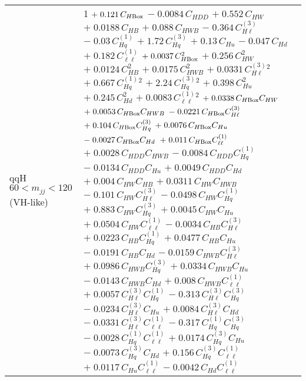 \begin{tabular}{l|p{}}
    qqH $60 < m_{jj} < 120$ (VH-like) & 1 $+\;0.121\,C_{H\rm{Box}}$ $-\;0.0084\,C_{HDD}$ $+\;0.552\,C_{HW}$ $+\;0.0188\,C_{HB}$ $+\;0.088\,C_{HWB}$ $-\;0.364\,C^{(3)}_{H\ell}$ $-\;0.03\,C^{(1)}_{Hq}$ $+\;1.72\,C^{(3)}_{Hq}$ $+\;0.13\,C_{Hu}$ $-\;0.047\,C_{Hd}$ $+\;0.182\,C^{(1)}_{\ell\ell}$ $+\;0.0037\,C_{H\rm{Box}}^{2}$ $+\;0.256\,C_{HW}^{2}$ $+\;0.0124\,C_{HB}^{2}$ $+\;0.0175\,C_{HWB}^{2}$ $+\;0.0331\,C^{(3)}_{H\ell}^{2}$ $+\;0.667\,C^{(1)}_{Hq}^{2}$ $+\;2.24\,C^{(3)}_{Hq}^{2}$ $+\;0.398\,C_{Hu}^{2}$ $+\;0.245\,C_{Hd}^{2}$ $+\;0.0083\,C^{(1)}_{\ell\ell}^{2}$ $+\;0.0338\,C_{H\rm{Box}}C_{HW}$ $+\;0.0053\,C_{H\rm{Box}}C_{HWB}$ $-\;0.0221\,C_{H\rm{Box}}C^{(3)}_{H\ell}$ $+\;0.104\,C_{H\rm{Box}}C^{(3)}_{Hq}$ $+\;0.0076\,C_{H\rm{Box}}C_{Hu}$ $-\;0.0027\,C_{H\rm{Box}}C_{Hd}$ $+\;0.011\,C_{H\rm{Box}}C^{(1)}_{\ell\ell}$ $+\;0.0028\,C_{HDD}C_{HWB}$ $-\;0.0084\,C_{HDD}C^{(1)}_{Hq}$ $-\;0.0134\,C_{HDD}C_{Hu}$ $+\;0.0049\,C_{HDD}C_{Hd}$ $+\;0.004\,C_{HW}C_{HB}$ $+\;0.0311\,C_{HW}C_{HWB}$ $-\;0.101\,C_{HW}C^{(3)}_{H\ell}$ $-\;0.0498\,C_{HW}C^{(1)}_{Hq}$ $+\;0.883\,C_{HW}C^{(3)}_{Hq}$ $+\;0.0045\,C_{HW}C_{Hu}$ $+\;0.0504\,C_{HW}C^{(1)}_{\ell\ell}$ $-\;0.0034\,C_{HB}C^{(3)}_{H\ell}$ $+\;0.0223\,C_{HB}C^{(1)}_{Hq}$ $+\;0.0477\,C_{HB}C_{Hu}$ $-\;0.0191\,C_{HB}C_{Hd}$ $-\;0.0159\,C_{HWB}C^{(3)}_{H\ell}$ $+\;0.0986\,C_{HWB}C^{(3)}_{Hq}$ $+\;0.0334\,C_{HWB}C_{Hu}$ $-\;0.0143\,C_{HWB}C_{Hd}$ $+\;0.008\,C_{HWB}C^{(1)}_{\ell\ell}$ $+\;0.0057\,C^{(3)}_{H\ell}C^{(1)}_{Hq}$ $-\;0.313\,C^{(3)}_{H\ell}C^{(3)}_{Hq}$ $-\;0.0234\,C^{(3)}_{H\ell}C_{Hu}$ $+\;0.0084\,C^{(3)}_{H\ell}C_{Hd}$ $-\;0.0331\,C^{(3)}_{H\ell}C^{(1)}_{\ell\ell}$ $-\;0.317\,C^{(1)}_{Hq}C^{(3)}_{Hq}$ $-\;0.0028\,C^{(1)}_{Hq}C^{(1)}_{\ell\ell}$ $+\;0.0174\,C^{(3)}_{Hq}C_{Hu}$ $-\;0.0073\,C^{(3)}_{Hq}C_{Hd}$ $+\;0.156\,C^{(3)}_{Hq}C^{(1)}_{\ell\ell}$ $+\;0.0117\,C_{Hu}C^{(1)}_{\ell\ell}$ $-\;0.0042\,C_{Hd}C^{(1)}_{\ell\ell}$ \\

\end{tabular}
